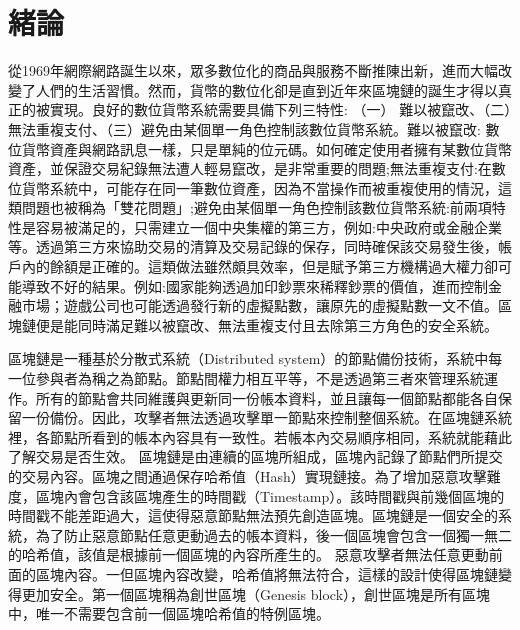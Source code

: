 
\chapter{緒論}
從1969年網際網路誕生以來，眾多數位化的商品與服務不斷推陳出新，進而大幅改變了人們的生活習慣。然而，貨幣的數位化卻是直到近年來區塊鏈的誕生才得以真正的被實現。良好的數位貨幣系統需要具備下列三特性:
（一） 難以被竄改、（二）無法重複支付、（三）避免由某個單一角色控制該數位貨幣系統。難以被竄改: 數位貨幣資產與網路訊息一樣，只是單純的位元碼。如何確定使用者擁有某數位貨幣資產，並保證交易紀錄無法遭人輕易竄改，是非常重要的問題;無法重複支付:在數位貨幣系統中，可能存在同一筆數位資產，因為不當操作而被重複使用的情況，這類問題也被稱為「雙花問題」;避免由某個單一角色控制該數位貨幣系統:前兩項特性是容易被滿足的，只需建立一個中央集權的第三方，例如:中央政府或金融企業等。透過第三方來協助交易的清算及交易記錄的保存，同時確保該交易發生後，帳戶內的餘額是正確的。這類做法雖然頗具效率，但是賦予第三方機構過大權力卻可能導致不好的結果。例如:國家能夠透過加印鈔票來稀釋鈔票的價值，進而控制金融市場；遊戲公司也可能透過發行新的虛擬點數，讓原先的虛擬點數一文不值。區塊鏈便是能同時滿足難以被竄改、無法重複支付且去除第三方角色的安全系統。

區塊鏈是一種基於分散式系統（Distributed system）的節點備份技術，系統中每一位參與者為稱之為節點。節點間權力相互平等，不是透過第三者來管理系統運作。所有的節點會共同維護與更新同一份帳本資料，並且讓每一個節點都能各自保留一份備份。因此，攻擊者無法透過攻擊單一節點來控制整個系統。在區塊鏈系統裡，各節點所看到的帳本內容具有一致性。若帳本內交易順序相同，系統就能藉此了解交易是否生效。
區塊鏈是由連續的區塊所組成，區塊內記錄了節點們所提交的交易內容。區塊之間通過保存哈希值（Hash）實現鏈接。為了增加惡意攻擊難度，區塊內會包含該區塊產生的時間戳（Timestamp）。該時間戳與前幾個區塊的時間戳不能差距過大，這使得惡意節點無法預先創造區塊。區塊鏈是一個安全的系統，為了防止惡意節點任意更動過去的帳本資料，後一個區塊會包含一個獨一無二的哈希值，該值是根據前一個區塊的內容所產生的。
惡意攻擊者無法任意更動前面的區塊內容。一但區塊內容改變，哈希值將無法符合，這樣的設計使得區塊鏈變得更加安全。第一個區塊稱為創世區塊（Genesis block），創世區塊是所有區塊中，唯一不需要包含前一個區塊哈希值的特例區塊。


